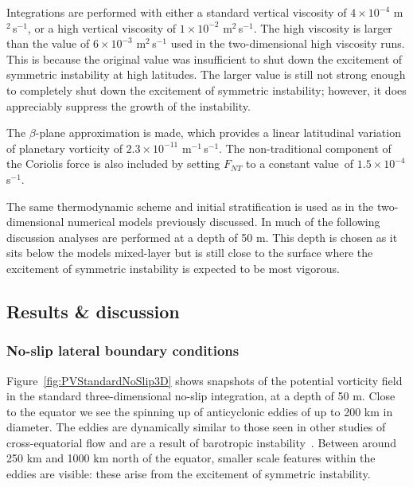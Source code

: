     Integrations are performed with either a standard vertical viscosity of $4\times 10^{-4}$ m$^2$\,s$^{-1}$, or a high vertical viscosity of $1\times 10^{-2}$ m$^2$\,s$^{-1}$. The high viscosity is larger than the value of $6\times 10^{-3}$ m$^2$\,s$^{-1}$ used in the two-dimensional high viscosity runs. This is because the original value was insufficient to shut down the excitement of symmetric instability at high latitudes. The larger value is still not strong enough to completely shut down the excitement of symmetric instability; however, it does appreciably suppress the growth of the instability.

    The $\beta$-plane approximation is made, which provides a linear latitudinal variation of planetary vorticity of $2.3\times 10^{-11}$ m$^{-1}$\,s$^{-1}$. The non-traditional component of the Coriolis force is also included by setting $F_{NT}$ to a constant value\footnotemark~of $1.5\times 10^{-4}$ s$^{-1}$.

    
    The same thermodynamic scheme and initial stratification is used as in the two-dimensional numerical models previously discussed. In much of the following discussion analyses are performed at a depth of 50 m. This depth is chosen as it sits below the models mixed-layer but is still close to the surface where the excitement of symmetric instability is expected to be most vigorous.

    \subsection{Results \& discussion}
    \label{subsec:3DResults}
    \subsubsection{No-slip lateral boundary conditions}
    Figure~\ref{fig:PVStandardNoSlip3D} shows snapshots of the potential vorticity field in the standard three-dimensional no-slip integration, at a depth of 50 m. Close to the equator we see the spinning up of anticyclonic eddies of up to 200 km in diameter. The eddies are dynamically similar to those seen in other studies of cross-equatorial flow and are a result of barotropic instability~\citep[e.g.][]{Edwards1998I, Edwards1998II, Jochum2003, Goes2009}. Between around 250 km and 1000 km north of the equator, smaller scale features within the eddies are visible: these arise from the excitement of symmetric instability.

